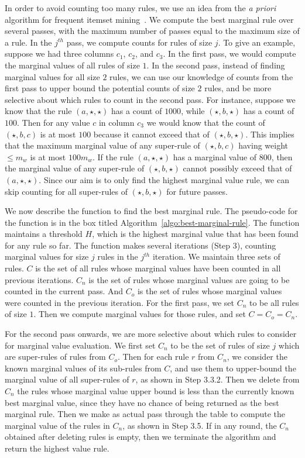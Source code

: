 In order to avoid counting too many rules, we use an idea from the {\em a priori} algorithm for frequent itemset mining~\cite{apriori}. We compute the best marginal rule over several passes, with the maximum number of passes equal to the maximum size of a rule. In the $j^{th}$ pass, we compute counts for rules of size $j$. To give an example, suppose we had three columns $c_1$, $c_2$, and $c_3$. In the first pass, we would compute the marginal values of all rules of size $1$. In the second pass, instead of finding marginal values for all size $2$ rules, we can use our knowledge of counts from the first pass to upper bound the potential counts of size $2$ rules, and be more selective about which rules to count in the second pass. For instance, suppose we know that the rule $(a, \star, \star)$ has a count of $1000$, while $(\star, b, \star)$ has a count of $100$. Then for any value $c$ in column $c_3$ we would know that the count of $(\star, b, c)$ is at most $100$ because it cannot exceed that of $(\star, b, \star)$. This implies that the maximum marginal value of any super-rule of $(\star, b, c)$ having weight $\leq m_w$ is at most $100m_w$. If the rule $(a, \star, \star)$ has a marginal value of $800$, then the marginal value of any super-rule of $(\star, b, \star)$ cannot possibly exceed that of $(a, \star, \star)$. Since our aim is to only find the highest marginal value rule, we can skip counting for all super-rules of $(\star, b, \star)$ for future passes.

We now describe the function to find the best marginal rule. The pseudo-code for the function is in the box titled Algorithm~\ref{algo:best-marginal-rule}. The function maintains a threshold $H$, which is the highest marginal value that has been found for any rule so far. The function makes several iterations (Step $3$), counting marginal values for size $j$ rules in the $j^{th}$ iteration. We maintain three sets of rules. $C$ is the set of all rules whose marginal values have been counted in all previous iterations. $C_n$ is the set of rules whose marginal values are going to be counted in the current pass. And $C_o$ is the set of rules whose marginal values were counted in the previous iteration. For the first pass, we set $C_n$ to be all rules of size $1$. Then we compute marginal values for those rules, and set $C = C_o = C_n$.

For the second pass onwards, we are more selective about which rules to consider for marginal value evaluation. We first set $C_n$ to be the set of rules of size $j$ which are super-rules of rules from $C_o$. Then for each rule $r$ from $C_n$, we consider the known marginal values of its sub-rules from $C$, and use them to upper-bound the marginal value of all super-rules of $r$, as shown in Step 3.3.2. Then we delete from $C_n$ the rules whose marginal value upper bound is less than the currently known best marginal value, since they have no chance of being returned as the best marginal rule. Then we make as actual pass through the table to compute the marginal value of the rules in $C_n$, as shown in Step 3.5. If in any round, the $C_n$ obtained after deleting rules is empty, then we terminate the algorithm and return the highest value rule. 

